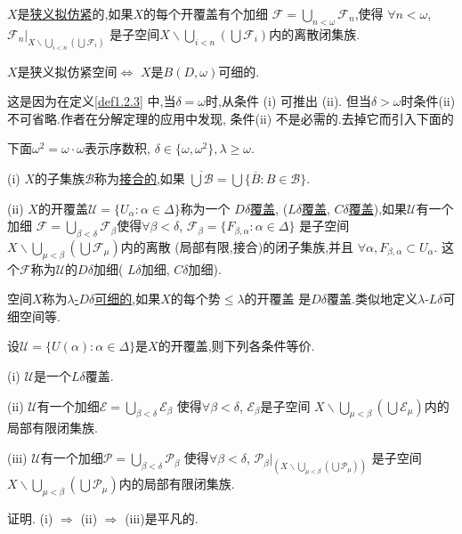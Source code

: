 \documentclass[main.tex]{subfiles}
\begin{document}
\begin{definition}
	$X$是\underline{狭义拟仿紧}的,如果$X$的每个开覆盖有个加细
	$\mathscr{F}=\bigcup_{n<\omega}\mathscr{F}_n$,使得
	$\forall n < \omega$, $\mathscr{F}_n|_{X\backslash\bigcup_{i<n}(\bigcup\mathscr{F}_i)}$
	是子空间$X\backslash\bigcup_{i<n}(\bigcup\mathscr{F}_i)$内的离散闭集族.
\end{definition}

\begin{fact}
	$X$是狭义拟仿紧空间$\Leftrightarrow$ $X$是$B(D,\omega)$可细的.
\end{fact}

这是因为在定义\ref{def1.2.3} 中,当$\delta=\omega$时,从条件 (i) 可推出 (ii).
但当$\delta>\omega$时条件(ii) 不可省略.作者在分解定理的应用中发现,
条件(ii) 不是必需的.去掉它而引入下面的

\begin{definition}\label{def1.2.5}
	下面$\omega^2=\omega\cdot\omega$表示序数积, $\delta\in\{\omega,\omega^2\}, \lambda\ge\omega$.
	
	\textnormal{(i)} $X$的子集族$\mathscr{B}$称为\underline{接合的},如果
	$\overline{\bigcup\mathscr{B}}=\bigcup\{\overline{B}: B\in\mathscr{B}\}$.
	
	\textnormal{(ii)} $X$的开覆盖$\mathscr{U}=\{U_\alpha:\alpha\in\Delta\}$称为一个
	\underline{$D\delta$覆盖}, \textnormal{(}\underline{$L\delta$覆盖}, 
	\underline{$C\delta$覆盖}\textnormal{)},如果$\mathscr{U}$有一个加细
   $\mathscr{F}=\bigcup_{\beta<\delta}\mathscr{F}_\beta$使得$\forall\beta<\delta$,
   $\mathscr{F}_\beta=\{F_{\beta,\alpha}: \alpha\in\Delta\}$
   是子空间$X\backslash\bigcup_{\mu<\beta}(\bigcup\mathscr{F}_\mu)$内的离散
   \textnormal{(}局部有限,接合\textnormal{)}的闭子集族,并且
   	$\forall\alpha, F_{\beta,\alpha}\subset U_\alpha$.
   	这个$\mathscr{F}$称为$\mathscr{U}$的$D\delta$加细\textnormal{(}
   	$L\delta$加细, $C\delta$加细\textnormal{)}.
   	
   	空间$X$称为\underline{$\lambda$-$D\delta$可细的},如果$X$的每个势$\le\lambda$的开覆盖
   	是$D\delta$覆盖.类似地定义$\lambda$-$L\delta$可细空间等.
\end{definition}

\begin{proposition}
	设$\mathscr{U}=\{U(\alpha): \alpha\in\Delta\}$是$X$的开覆盖,则下列各条件等价.
	
	\textnormal{(i)} $\mathscr{U}$是一个$L\delta$覆盖.
	
	\textnormal{(ii)}  $\mathscr{U}$有一个加细$\mathscr{E}=\bigcup_{\beta<\delta}\mathscr{E}_\beta$
	使得$\forall\beta<\delta$, $\mathscr{E}_\beta$是子空间
	$X\backslash\bigcup_{\mu<\beta}(\bigcup\mathscr{E}_\mu)$内的局部有限闭集族.
	
	\textnormal{(iii)} $\mathscr{U}$有一个加细$\mathscr{P}=\bigcup_{\beta<\delta}\mathscr{P}_\beta$
	使得$\forall\beta<\delta$, $\mathscr{P}_\beta|_{(X\backslash\bigcup_{\mu<\beta}(\bigcup\mathscr{P}_\mu))}$
	是子空间
	$X\backslash\bigcup_{\mu<\beta}(\bigcup\mathscr{P}_\mu)$内的局部有限闭集族.
\end{proposition}
证明. (i) $\Rightarrow$ (ii) $\Rightarrow$ (iii)是平凡的.
\end{document}
